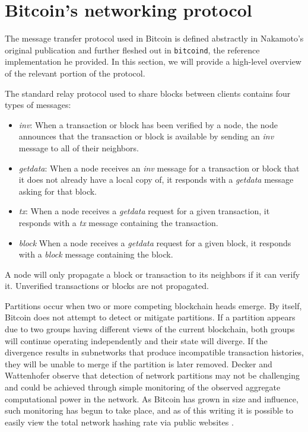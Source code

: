 \section{Bitcoin's networking protocol}
The message transfer protocol used in Bitcoin is defined abstractly in Nakamoto's original publication \cite{Nakamoto} and further fleshed out in \texttt{bitcoind}, the reference implementation he provided. In this section, we will provide a high-level overview of the relevant portion of the protocol. %

The standard relay protocol used to share blocks between clients contains four types of messages:

\begin{itemize}

\item \textit{inv}: When a transaction or block has been verified by a node, the node announces that the transaction or block is available by sending an \textit{inv} message to all of their neighbors.
\item \textit{getdata}: When a node receives an \textit{inv} message for a transaction or block that it does not already have a local copy of, it responds with a \textit{getdata} message asking for that block.
\item \textit{tx}: When a node receives a \textit{getdata} request for a given transaction, it responds with a \textit{tx} message containing the transaction.
\item \textit{block} When a node receives a \textit{getdata} request for a given block, it responds with a \textit{block} message containing the block.

\end{itemize}

A node will only propagate a block or transaction to its neighbors if it can verify it. Unverified transactions or blocks are not propagated. %

Partitions occur when two or more competing blockchain heads emerge. 
By itself, Bitcoin does not attempt to detect or mitigate partitions. If a partition appears due to two groups having different views of the current blockchain, both groups will continue operating independently and their state will diverge. If the divergence results in subnetworks that produce incompatible transaction histories, they will be unable to merge if the partition is later removed. Decker and Wattenhofer \cite{DeckerWattenhofer2013} observe that detection of network partitions may not be challenging and could be achieved through simple monitoring of the observed aggregate computational power in the network. As Bitcoin has grown in size and influence, such monitoring has begun to take place, and as of this writing it is possible to easily view the total network hashing rate via public websites \cite{sipa}.



